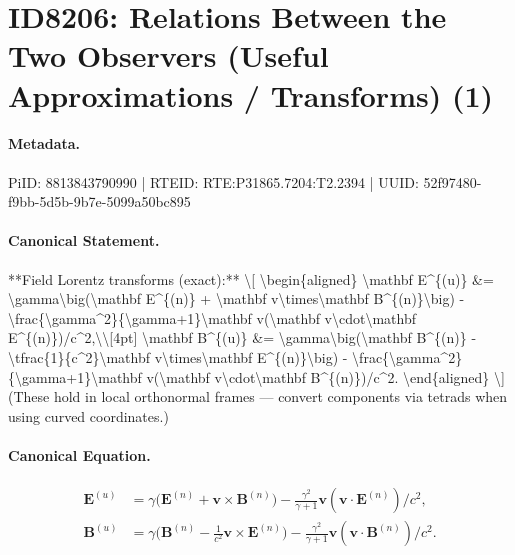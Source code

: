 \section*{ID8206: Relations Between the Two Observers (Useful Approximations / Transforms) (1)}
\paragraph{Metadata.}
PiID: 8813843790990 | RTEID: RTE:P31865.7204:T2.2394 | UUID: 52f97480-f9bb-5d5b-9b7e-5099a50bc895

\paragraph{Canonical Statement.}
**Field Lorentz transforms (exact):** \textbackslash{}[ \textbackslash{}begin\{aligned\} \textbackslash{}mathbf E\textasciicircum{}\{(u)\} \&= \textbackslash{}gamma\textbackslash{}big(\textbackslash{}mathbf E\textasciicircum{}\{(n)\} + \textbackslash{}mathbf v\textbackslash{}times\textbackslash{}mathbf B\textasciicircum{}\{(n)\}\textbackslash{}big) - \textbackslash{}frac\{\textbackslash{}gamma\textasciicircum{}2\}\{\textbackslash{}gamma+1\}\textbackslash{}mathbf v(\textbackslash{}mathbf v\textbackslash{}cdot\textbackslash{}mathbf E\textasciicircum{}\{(n)\})/c\textasciicircum{}2,\textbackslash{}\textbackslash{}[4pt] \textbackslash{}mathbf B\textasciicircum{}\{(u)\} \&= \textbackslash{}gamma\textbackslash{}big(\textbackslash{}mathbf B\textasciicircum{}\{(n)\} - \textbackslash{}tfrac\{1\}\{c\textasciicircum{}2\}\textbackslash{}mathbf v\textbackslash{}times\textbackslash{}mathbf E\textasciicircum{}\{(n)\}\textbackslash{}big) - \textbackslash{}frac\{\textbackslash{}gamma\textasciicircum{}2\}\{\textbackslash{}gamma+1\}\textbackslash{}mathbf v(\textbackslash{}mathbf v\textbackslash{}cdot\textbackslash{}mathbf B\textasciicircum{}\{(n)\})/c\textasciicircum{}2. \textbackslash{}end\{aligned\} \textbackslash{}] (These hold in local orthonormal frames — convert components via tetrads when using curved coordinates.)

\paragraph{Canonical Equation.}
\[
\begin{aligned} \mathbf E^{(u)} &= \gamma\big(\mathbf E^{(n)} + \mathbf v\times\mathbf B^{(n)}\big) - \frac{\gamma^2}{\gamma+1}\mathbf v(\mathbf v\cdot\mathbf E^{(n)})/c^2,\\[4pt] \mathbf B^{(u)} &= \gamma\big(\mathbf B^{(n)} - \tfrac{1}{c^2}\mathbf v\times\mathbf E^{(n)}\big) - \frac{\gamma^2}{\gamma+1}\mathbf v(\mathbf v\cdot\mathbf B^{(n)})/c^2. \end{aligned}
\]

